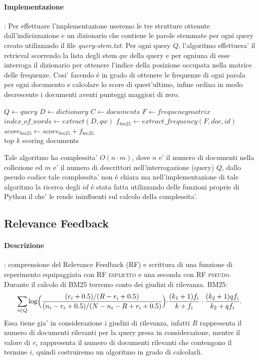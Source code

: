 \paragraph{\textbf{Implementazione}}: 
Per effettuare l'implementazione useremo le tre strutture ottenute dall'indicizzazione e un dizionario che contiene le parole stemmate per ogni query creato utilizzando il file \textit{query-stem.txt}. Per ogni query $Q$, l'algoritmo effettuera' il retrieval scorrendo la lista degli stem $qw$ della query e per ogniuna di esse interroga il dizionario per ottenere l'indice della posizione occupata nella matrice delle frequenze. Cosi' facendo \'e in grado di ottenere le frequenze di ogni parola per ogni documento e calcolare lo score di quest'ultimo, infine ordina in modo decrescente i documenti aventi punteggi maggiori di zero.
\begin{algorithmic}
\State $Q \gets query$
\State $D \gets dictionary$
\State $C \gets documents$
\State $F \gets frequency matrix$
	\State $index\_of\_words \gets extract(D,qw)$
			\State $f_{bm25} \gets extract\_frequency(F,doc,id)$
		\EndFor
		\State $score_{bm25} \gets score_{bm25} + f_{bm25}$
	\EndFor
\EndFor\\
\Return top $k$ scoring documents
\end{algorithmic}
Tale algoritmo ha complessita' $O(n \cdot m)$, dove $n$ e' il numero di documenti nella collezione ed $m$ e' il numero di descrittori nell'interrogazione (query) $Q$, dallo pseudo codice tale complessita' non \'e chiara ma nell'implementazione di tale algoritmo la ricerca degli $id$ \'e stata fatta utilizzando delle funzioni proprie di Python il che' le rende ininfluenti sul calcolo della complessita'. 

\subsection{Relevance Feedback}
\label{sec:relevance-feedback}

\paragraph{\textbf{Descrizione}}: comprensione del Relevance Feedback (\textsc{RF}) e scrittura di una funzione di reperimento equipaggiata con \textsc{RF esplicito} e una seconda con \textsc{RF pseudo}.
Durante il calcolo di \textsc{BM25} terremo conto dei giudizi di rilevanza.
BM25:
\[ \sum\limits_{i \in Q}\log\Bigl(\frac{(r_i+0.5)/(R-r_i+0.5)}{(n_i-r_i+0.5)/(N-n_i-R+r_i+0.5)}\Bigl)\cdot\frac{(k_1+1)f_i}{k+f_i}\cdot\frac{(k_2+1)qf_i}{k_2+qf_i}. \]
Essa tiene gia' in considerazione i giudizi di rilevanza, infatti $R$ rappresenta il numero di documenti rilevanti per la query presa in considerazione, mentre il valore di $r_i$ rappresenta il numero di documenti rilevanti che contengono il termine $i$, quindi costruiremo un algoritmo in grado di calcolarli.

